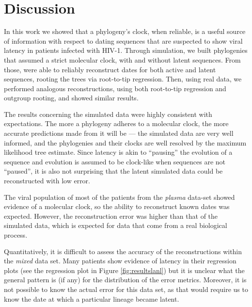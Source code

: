 \documentclass[12pt]{article}
\begin{document}
\section * {Discussion} \label{sec:discuss}

In this work we showed that a phylogeny's clock, when reliable, is a useful source of information with respect to dating sequences that are suspected to show viral latency in patients infected with HIV-1. 
Through simulation, we built phylogenies that assumed a strict molecular clock, with and without latent sequences.
From those, were able to reliably reconstruct dates for both active and latent sequences, rooting the trees via root-to-tip regression.
Then, using real data, we performed analogous reconstructions, using both root-to-tip regression and outgroup rooting, and showed similar results.

The results concerning the simulated data were highly consistent with expectations. 
The more a phylogeny adheres to a molecular clock, the more accurate predictions made from it will be --- the simulated data are very well informed, and the phylogenies and their clocks are well resolved by the maximum likelihood tree estimate. 
Since latency is akin to ``pausing'' the evolution of a sequence and evolution is assumed to be clock-like when sequences are not ``paused'', it is also not surprising that the latent simulated data could be reconstructed with low error. 

The viral population of most of the patients from the {\em plasma} data-set showed evidence of a molecular clock, so the ability to reconstruct known dates was expected.
However, the reconstruction error was higher than that of the simulated data, which is expected for data that come from a real biological process.

Quantitatively, it is difficult to assess the accuracy of the reconstructions within the {\em mixed} data set. 
Many patients show evidence of latency in their regression plots (see the regression plot in Figure \ref{fig:resultslanl}) but it is unclear what the general pattern is (if any) for the distribution of the error metrics. 
Moreover, it is not possible to know the actual error for this data set, as that would require us to know the date at which a particular lineage became latent. 
\end{document}
